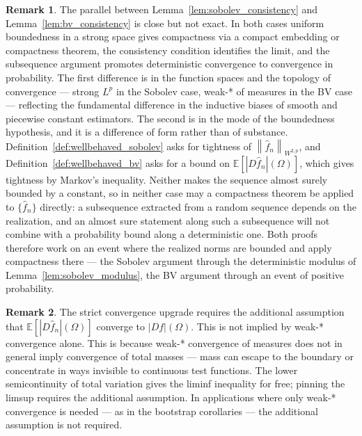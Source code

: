 \documentclass[12pt,a4paper]{article}
\numberwithin{equation}{section}
\theoremstyle{plain}
\theoremstyle{definition}
\newtheorem{remark}{Remark}
\newcommand{\norm}[1]{\left\| #1 \right\|}
\newcommand{\E}{\mathbb{E}}
\newcommand{\fn}{\hat{f}_n}
\begin{document}
	\begin{remark}
		The parallel between Lemma~\ref{lem:sobolev_consistency} and
		Lemma~\ref{lem:bv_consistency} is close but not exact. In both cases
		uniform boundedness in a strong space gives compactness via a compact
		embedding or compactness theorem, the consistency condition identifies
		the limit, and the subsequence argument promotes deterministic
		convergence to convergence in probability. The first difference is in the
		function spaces and the topology of convergence --- strong $L^p$ in the
		Sobolev case, weak-* of measures in the BV case --- reflecting the
		fundamental difference in the inductive biases of smooth and piecewise
		constant estimators. The second is in the mode of the boundedness
		hypothesis, and it is a difference of form rather than of substance.
		Definition~\ref{def:wellbehaved_sobolev} asks for tightness of
		$\norm{\fn}_{W^{2,p}}$, and Definition~\ref{def:wellbehaved_bv} asks for
		a bound on $\E[|D\fn|(\Omega)]$, which gives tightness by Markov's
		inequality. Neither makes the sequence almost surely bounded by a
		constant, so in neither case may a compactness theorem be applied to
		$\{\fn\}$ directly: a subsequence extracted from a random sequence
		depends on the realization, and an almost sure statement along such a
		subsequence will not combine with a probability bound along a
		deterministic one. Both proofs therefore work on an event where the
		realized norms are bounded and apply compactness there --- the Sobolev
		argument through the deterministic modulus of
		Lemma~\ref{lem:sobolev_modulus}, the BV argument through an event of
		positive probability.
	\end{remark}
	
	\begin{remark}
		The strict convergence upgrade requires the additional assumption that
		$\E[|D\fn|(\Omega)]$ converge to $|Df|(\Omega)$. This is not implied by
		weak-* convergence alone. This is because weak-* convergence of measures does not
		in general imply convergence of total masses --- mass can escape to the
		boundary or concentrate in ways invisible to continuous test functions. The
		lower semicontinuity of total variation \citep[Theorem~5.2]{evans2015measure}
		gives the liminf inequality for free; pinning the limsup requires the
		additional assumption. In applications where only weak-* convergence is
		needed --- as in the bootstrap corollaries --- the additional assumption
		is not required.
	\end{remark}
	
\end{document}

